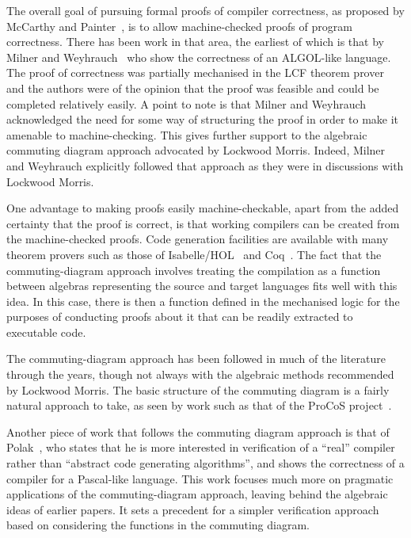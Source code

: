 \documentclass[a4paper,10pt]{report}
\begin{document}
The overall goal of pursuing formal proofs of compiler correctness, as
proposed by McCarthy and Painter~\cite{mccarthy1967}, is to allow
machine-checked proofs of program correctness.
There has been work in that area, the earliest of which is that by
Milner and Weyhrauch~\cite{milner1972} who show the correctness of an
ALGOL-like language.
The proof of correctness was partially mechanised in the LCF theorem
prover~\cite{milner1972a} and the authors were of the opinion that the
proof was feasible and could be completed relatively easily.
A point to note is that Milner and Weyhrauch acknowledged the need for
some way of structuring the proof in order to make it amenable to
machine-checking.
This gives further support to the algebraic commuting diagram approach
advocated by Lockwood Morris.
Indeed, Milner and Weyhrauch explicitly followed that approach as they
were in discussions with Lockwood Morris.

One advantage to making proofs easily machine-checkable, apart from
the added certainty that the proof is correct, is that working
compilers can be created from the machine-checked proofs.
Code generation facilities are available with many theorem provers
such as those of Isabelle/HOL~\cite{haftmann2007} and
Coq~\cite{letouzey2003, letouzey2008}.
The fact that the commuting-diagram approach involves treating the
compilation as a function between algebras representing the source and
target languages fits well with this idea.
In this case, there is then a function defined in the mechanised logic
for the purposes of conducting proofs about it that can be readily
extracted to executable code.

The commuting-diagram approach has been followed in much of the
literature through the years, though not always with the algebraic
methods recommended by Lockwood Morris.
The basic structure of the commuting diagram is a fairly natural
approach to take, as seen by work such as that of the ProCoS
project~\cite{buth1992}.

Another piece of work that follows the commuting diagram approach is
that of Polak~\cite{polak1981}, who states that he is more interested
in verification of a ``real'' compiler rather than ``abstract code
generating algorithms'', and shows the correctness of a compiler for a
Pascal-like language.
This work focuses much more on pragmatic applications of the
commuting-diagram approach, leaving behind the algebraic ideas of
earlier papers.
It sets a precedent for a simpler verification approach based on
considering the functions in the commuting diagram.
\end{document}
